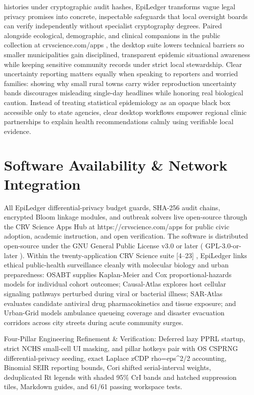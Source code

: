 \documentclass[10pt,letterpaper]{article}
\begin{document}
histories under cryptographic audit hashes, EpiLedger transforms vague legal privacy promises into concrete, inspectable safeguards that local oversight boards can verify independently without specialist cryptography degrees. Paired alongside ecological, demographic, and clinical companions in the public collection at crvscience.com/apps , the desktop suite lowers technical barriers so smaller municipalities gain disciplined, transparent epidemic situational awareness while keeping sensitive community records under strict local stewardship. Clear uncertainty reporting matters equally when speaking to reporters and worried families: showing why small rural towns carry wider reproduction uncertainty bands discourages misleading single-day headlines while honoring real biological caution. Instead of treating statistical epidemiology as an opaque black box accessible only to state agencies, clear desktop workflows empower regional clinic partnerships to explain health recommendations calmly using verifiable local evidence.

\section{Software Availability \& Network Integration}
All EpiLedger differential-privacy budget guards, SHA-256 audit chains, encrypted Bloom linkage modules, and outbreak solvers live open-source through the CRV Science Apps Hub at https://crvscience.com/apps for public civic adoption, academic instruction, and open verification. The software is distributed open-source under the GNU General Public License v3.0 or later ( GPL-3.0-or-later ). Within the twenty-application CRV Science suite [4--23] , EpiLedger links ethical public-health surveillance cleanly with molecular biology and urban preparedness: OSABT supplies Kaplan-Meier and Cox proportional-hazards models for individual cohort outcomes; Causal-Atlas explores host cellular signaling pathways perturbed during viral or bacterial illness; SAR-Atlas evaluates candidate antiviral drug pharmacokinetics and tissue exposure; and Urban-Grid models ambulance queueing coverage and disaster evacuation corridors across city streets during acute community surges.

Four-Pillar Engineering Refinement \& Verification: Deferred lazy PPRL startup, strict NCHS small-cell UI masking, and pillar hotkeys pair with OS CSPRNG differential-privacy seeding, exact Laplace zCDP rho=eps\textasciicircum{}2/2 accounting, Binomial SEIR reporting bounds, Cori shifted serial-interval weights, deduplicated Rt legends with shaded 95\% CrI bands and hatched suppression tiles, Markdown guides, and 61/61 passing workspace tests.
\end{document}
